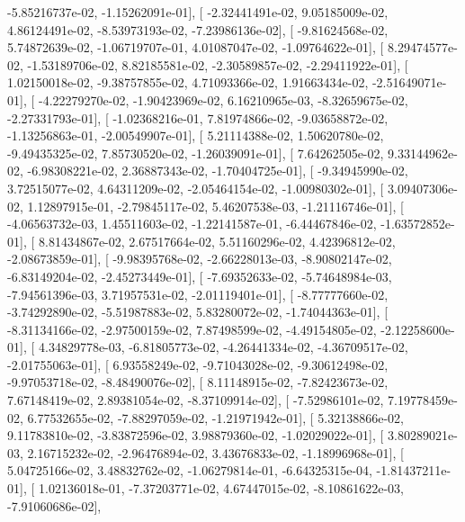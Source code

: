 \documentclass{article}
\begin{document}
         -5.85216737e-02,  -1.15262091e-01],
       [ -2.32441491e-02,   9.05185009e-02,   4.86124491e-02,
         -8.53973193e-02,  -7.23986136e-02],
       [ -9.81624568e-02,   5.74872639e-02,  -1.06719707e-01,
          4.01087047e-02,  -1.09764622e-01],
       [  8.29474577e-02,  -1.53189706e-02,   8.82185581e-02,
         -2.30589857e-02,  -2.29411922e-01],
       [  1.02150018e-02,  -9.38757855e-02,   4.71093366e-02,
          1.91663434e-02,  -2.51649071e-01],
       [ -4.22279270e-02,  -1.90423969e-02,   6.16210965e-03,
         -8.32659675e-02,  -2.27331793e-01],
       [ -1.02368216e-01,   7.81974866e-02,  -9.03658872e-02,
         -1.13256863e-01,  -2.00549907e-01],
       [  5.21114388e-02,   1.50620780e-02,  -9.49435325e-02,
          7.85730520e-02,  -1.26039091e-01],
       [  7.64262505e-02,   9.33144962e-02,  -6.98308221e-02,
          2.36887343e-02,  -1.70404725e-01],
       [ -9.34945990e-02,   3.72515077e-02,   4.64311209e-02,
         -2.05464154e-02,  -1.00980302e-01],
       [  3.09407306e-02,   1.12897915e-01,  -2.79845117e-02,
          5.46207538e-03,  -1.21116746e-01],
       [ -4.06563732e-03,   1.45511603e-02,  -1.22141587e-01,
         -6.44467846e-02,  -1.63572852e-01],
       [  8.81434867e-02,   2.67517664e-02,   5.51160296e-02,
          4.42396812e-02,  -2.08673859e-01],
       [ -9.98395768e-02,  -2.66228013e-03,  -8.90802147e-02,
         -6.83149204e-02,  -2.45273449e-01],
       [ -7.69352633e-02,  -5.74648984e-03,  -7.94561396e-03,
          3.71957531e-02,  -2.01119401e-01],
       [ -8.77777660e-02,  -3.74292890e-02,  -5.51987883e-02,
          5.83280072e-02,  -1.74044363e-01],
       [ -8.31134166e-02,  -2.97500159e-02,   7.87498599e-02,
         -4.49154805e-02,  -2.12258600e-01],
       [  4.34829778e-03,  -6.81805773e-02,  -4.26441334e-02,
         -4.36709517e-02,  -2.01755063e-01],
       [  6.93558249e-02,  -9.71043028e-02,  -9.30612498e-02,
         -9.97053718e-02,  -8.48490076e-02],
       [  8.11148915e-02,  -7.82423673e-02,   7.67148419e-02,
          2.89381054e-02,  -8.37109914e-02],
       [ -7.52986101e-02,   7.19778459e-02,   6.77532655e-02,
         -7.88297059e-02,  -1.21971942e-01],
       [  5.32138866e-02,   9.11783810e-02,  -3.83872596e-02,
          3.98879360e-02,  -1.02029022e-01],
       [  3.80289021e-03,   2.16715232e-02,  -2.96476894e-02,
          3.43676833e-02,  -1.18996968e-01],
       [  5.04725166e-02,   3.48832762e-02,  -1.06279814e-01,
         -6.64325315e-04,  -1.81437211e-01],
       [  1.02136018e-01,  -7.37203771e-02,   4.67447015e-02,
         -8.10861622e-03,  -7.91060686e-02],
\end{document}
